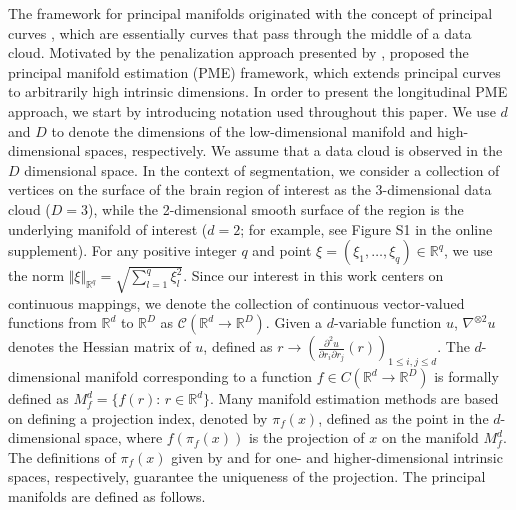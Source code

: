 \documentclass[12pt]{article}
\theoremstyle{definition}
\begin{document}
The framework for principal manifolds originated with the concept of principal curves \citep{hastie1989Principal}, which are essentially curves that pass through the middle of a data cloud. Motivated by the penalization approach presented by \cite{smola2001Regularized}, \cite{meng2021Principal} proposed the principal manifold estimation (PME) framework, which extends principal curves to arbitrarily high intrinsic dimensions. In order to present the longitudinal PME approach, we start by introducing notation used throughout this paper. We use $d$ and $D$ to denote the dimensions of the low-dimensional manifold and high-dimensional spaces, respectively. We assume that a data cloud is observed in the $D$ dimensional space. In the context of segmentation, we consider a collection of vertices on the surface of the brain region of interest as the 3-dimensional data cloud ($D=3$), while the 2-dimensional smooth surface of the region is the underlying manifold of interest ($d=2$; for example, see Figure S1 in the online supplement). For any positive integer $q$ and point $\xi=(\xi_1,\ldots,\xi_q)\in\mathbb{R}^q$, we use the norm $\Vert \xi\Vert_{\mathbb{R}^q}=\sqrt{\sum_{l=1}^q \xi_l^2}$. Since our interest in this work centers on continuous mappings, we denote the collection of continuous vector-valued functions from $\mathbb{R}^d$ to $\mathbb{R}^D$ as $\mathcal{C}(\mathbb{R}^{d} \to \mathbb{R}^{D})$. Given a $d$-variable function $u$, $\nabla^{\otimes 2} u$ denotes the Hessian matrix of $u$, defined as $r \to \left( \frac{\partial ^2 u}{\partial r_i \partial r_j}(r) \right)_{1 \leq i, j \leq d}$. The $d$-dimensional manifold corresponding to a function $f \in C(\mathbb{R}^{d} \to \mathbb{R}^{D})$ is formally defined as $M_f^d=\{f(r):\,r\in\mathbb{R}^d\}$. Many manifold estimation methods are based on defining a projection index, denoted by $\pi_f(x)$, defined as the point in the $d$-dimensional space, where $f(\pi_f(x))$ is the projection of $x$ on the manifold $M_f^d$. The definitions of $\pi_f(x)$ given by \cite{hastie1989Principal} and \cite{meng2021Principal} for one- and higher-dimensional intrinsic spaces, respectively, guarantee the uniqueness of the projection. The principal manifolds are defined as follows.
\end{document}
